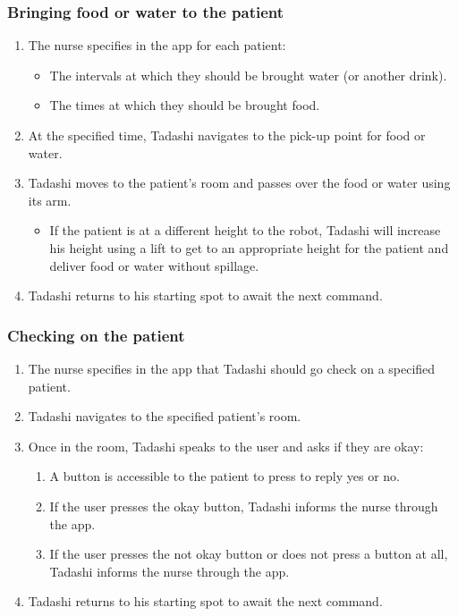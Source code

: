 \documentclass{article}
\begin{document}
\subsubsection{Bringing food or water to the patient}
\begin{enumerate}
\item The nurse specifies in the app for each patient:
  \begin{itemize}
  \item The intervals at which they should be brought water (or another drink).
  \item The times at which they should be brought food.
  \end{itemize}
\item At the specified time, Tadashi navigates to the pick-up point for food or water.
\item Tadashi moves to the patient's room and passes over the food or water using its arm.
  \begin{itemize}
  \item If the patient is at a different height to the robot, Tadashi will increase his height using a lift to get to an appropriate height for the patient and deliver food or water without spillage. 
  \end{itemize}
\item Tadashi returns to his starting spot to await the next command.
\end{enumerate}


\subsubsection{Checking on the patient}
\begin{enumerate}
\item The nurse specifies in the app that Tadashi should go check on a specified patient. 
\item Tadashi navigates to the specified patient's room.
\item Once in the room, Tadashi speaks to the user and asks if they are okay:
  \begin{enumerate}
  \item A button is accessible to the patient to press to reply yes or no.
  \item If the user presses the okay button, Tadashi informs the nurse through the app. 
  \item If the user presses the not okay button or does not press a button at all, Tadashi informs the nurse through the app.
  \end{enumerate}
\item Tadashi returns to his starting spot to await the next command. 
\end{enumerate}
\end{document}
